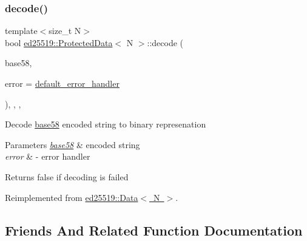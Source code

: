 \mbox{\label{classed25519_1_1_protected_data_a708852546126e7d19229e247b92a98f6}} 
\subsubsection{\texorpdfstring{decode()}{decode()}}
{\footnotesize\ttfamily template$<$size\+\_\+t N$>$ \\
bool \mbox{\hyperlink{classed25519_1_1_protected_data}{ed25519\+::\+Protected\+Data}}$<$ N $>$\+::decode (\begin{DoxyParamCaption}\item[{const std\+::string \&}]{base58,  }\item[{const \mbox{\hyperlink{namespaceed25519_a6ba572942b3c18591fc869d52a6b16e6}{Error\+Handler}} \&}]{error = {\ttfamily \mbox{\hyperlink{namespaceed25519_a7c7bb6ed17541162959c33ed3e3b15fb}{default\+\_\+error\+\_\+handler}}} }\end{DoxyParamCaption})\hspace{0.3cm}{\ttfamily [inline]}, {\ttfamily [override]}, {\ttfamily [protected]}, {\ttfamily [virtual]}}

Decode \mbox{\hyperlink{namespaceed25519_1_1base58}{base58}} encoded string to binary represenation 
\begin{DoxyParams}{Parameters}
{\em \mbox{\hyperlink{namespaceed25519_1_1base58}{base58}}} & encoded string \\
\hline
{\em error} & -\/ error handler \\
\hline
\end{DoxyParams}
\begin{DoxyReturn}{Returns}
false if decoding is failed 
\end{DoxyReturn}


Reimplemented from \mbox{\hyperlink{classed25519_1_1_data_a281d932d3c3fe7fd40ce86ea7eff559b}{ed25519\+::\+Data$<$ N $>$}}.



\subsection{Friends And Related Function Documentation}
\mbox{\label{classed25519_1_1_protected_data_ad89670fe663c8c8526b69b1bc6a87c19}} 
